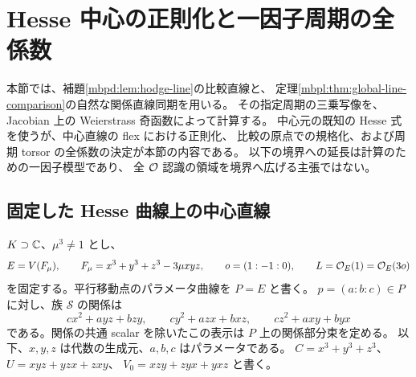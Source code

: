 \section{Hesse 中心の正則化と一因子周期の全係数}
\label{mbhp:sec:hesse-phase}

本節では、補題\ref{mbpd:lem:hodge-line}の比較直線と、
定理\ref{mbpl:thm:global-line-comparison}の自然な関係直線同期を用いる。
その指定周期の三乗写像を、Jacobian 上の Weierstrass 奇函数によって計算する。
中心元の既知の Hesse 式を使うが、中心直線の flex における正則化、
比較の原点での規格化、および周期 torsor の全係数の決定が本節の内容である。
以下の境界への延長は計算のための一因子模型であり、
全 $\mathcal O$ 認識の領域を境界へ広げる主張ではない。

\subsection{固定した Hesse 曲線上の中心直線}

$K\supset\mathbb C$、$\mu^3\ne1$ とし、
\[
 E=V(F_\mu),\qquad
 F_\mu=x^3+y^3+z^3-3\mu xyz,\qquad
 o=(1:-1:0),\qquad L=\mathcal O_E(1)=\mathcal O_E(3o)
\]
を固定する。平行移動点のパラメータ曲線を $P=E$ と書く。
$p=(a:b:c)\in P$ に対し、族 $\mathcal S$ の関係は
\[
 cx^2+ayz+bzy,\qquad cy^2+azx+bxz,\qquad cz^2+axy+byx
\]
である。関係の共通 scalar を除いたこの表示は $P$ 上の関係部分束を定める。
以下、$x,y,z$ は代数の生成元、$a,b,c$ はパラメータである。
$C=x^3+y^3+z^3$、$U=xyz+yzx+zxy$、
$V_0=xzy+zyx+yxz$ と書く。


